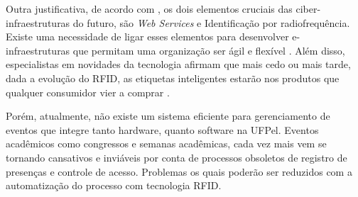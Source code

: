 \documentclass[tcc,capa]{texufpel}
\begin{document}
        Outra justificativa, de acordo com \cite{Sundaram:2010}, os dois elementos cruciais das ciber-infraestruturas do futuro, são \textit{Web Services} e Identificação por radiofrequência. Existe uma necessidade de ligar esses elementos para desenvolver e-infraestruturas que permitam uma organização ser ágil e flexível . Além disso, especialistas em novidades da tecnologia afirmam que mais cedo ou mais tarde, dada a evolução do RFID, as etiquetas inteligentes estarão nos produtos que qualquer consumidor vier a comprar \cite{bernardo2004tecnologia}. 
        
        Porém, atualmente, não existe um sistema eficiente para gerenciamento de eventos que integre tanto hardware, quanto software na UFPel. Eventos acadêmicos como congressos e semanas acadêmicas, cada vez mais vem se tornando cansativos e inviáveis por conta de processos obsoletos de registro de presenças e controle de acesso. Problemas os quais poderão ser reduzidos com a automatização do processo com tecnologia RFID.
    
    
    
        
        
        
        
\end{document}
